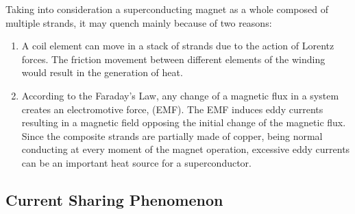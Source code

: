 Taking into consideration a superconducting magnet as a whole composed of multiple strands, it may quench mainly because of two reasons: 
\begin{enumerate}
    \item A coil element can move in a stack of strands due to the action of Lorentz forces. The friction movement between different elements of the winding  would result in the generation of heat.
    \item According to the Faraday's Law, any change of a magnetic flux in a system creates an electromotive force, (EMF). The EMF induces eddy currents resulting in a magnetic field opposing the initial change of the magnetic flux. Since the composite strands are partially made of copper, being normal conducting at every moment of the magnet operation, excessive eddy currents can be an important heat source for a superconductor.
\end{enumerate}

\subsection{Current Sharing Phenomenon}

